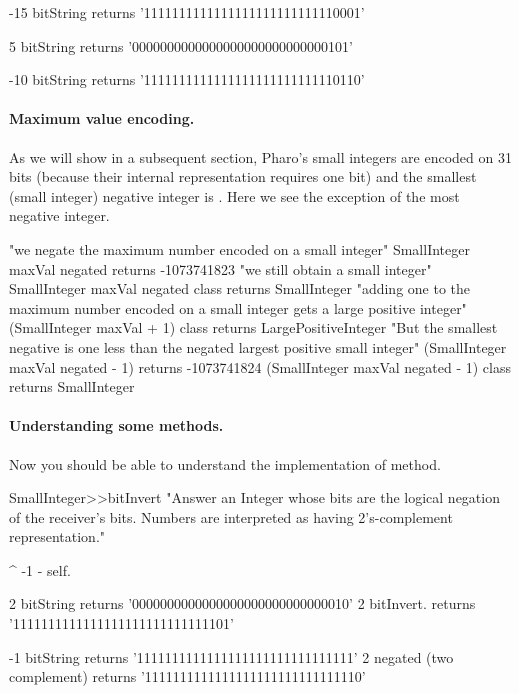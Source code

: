 \documentclass[a4paper,10pt,twoside]{book}
\begin{document}
\begin{code}{}
-15 bitString 
	returns '1111111111111111111111111110001'

5 bitString 
	returns '0000000000000000000000000000101'
	
-10 bitString 
	returns '1111111111111111111111111110110'
\end{code}


\paragraph{Maximum value encoding.}		
As we will show in a subsequent section, Pharo's small integers are encoded on 31 bits (because their internal representation requires one bit) and the smallest (small integer) negative integer is . Here we see the exception of the most negative integer.


\begin{code}{} 
"we negate the maximum number encoded on a small integer"
SmallInteger maxVal negated	 
	  	returns -1073741823
"we still obtain a small integer"		
SmallInteger maxVal negated class
		returns SmallInteger
"adding one to the maximum number encoded on a small integer gets a large positive integer"
(SmallInteger maxVal + 1) class
		returns LargePositiveInteger		
"But the smallest negative is one less than the negated largest positive small integer"		
(SmallInteger maxVal negated - 1) 
		returns -1073741824 
(SmallInteger maxVal negated - 1) class 
		returns SmallInteger 		 
\end{code}


\paragraph{Understanding some methods.}
Now you should be able to understand the implementation of  method.

\begin{code}{}
SmallInteger>>bitInvert
    "Answer an Integer whose bits are the logical negation of the receiver's bits.
    Numbers are interpreted as having 2's-complement representation."

	^ -1 - self.
\end{code}

\begin{code}{}
2 bitString
	returns '0000000000000000000000000000010'
2 bitInvert.
	returns '1111111111111111111111111111101'
	
-1 bitString
	returns '1111111111111111111111111111111'
2 negated (two complement)
	returns '1111111111111111111111111111110'
\end{code}
\end{document}
